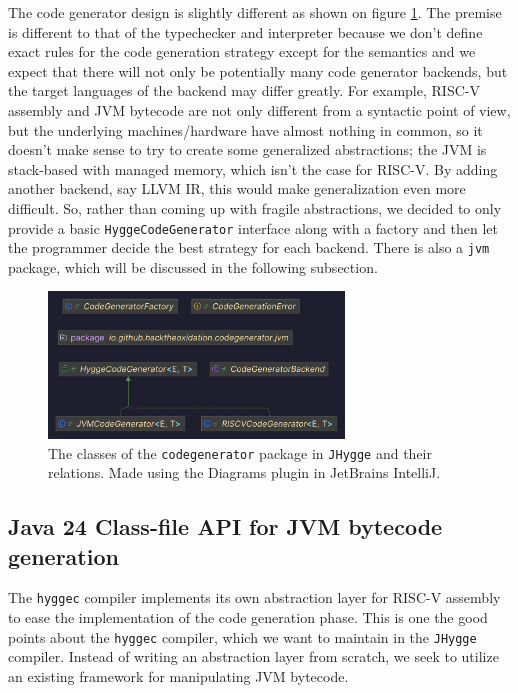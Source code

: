 The code generator design is slightly different as shown on figure \ref{fig:codegenerator_classes}. The premise is different to that of the typechecker and interpreter because we don't define
exact rules for the code generation strategy except for the semantics and we expect that there will not only be potentially many code generator backends,
but the target languages of the backend may differ greatly. For example, RISC-V assembly and JVM bytecode are not only different from a syntactic point
of view, but the underlying machines/hardware have almost nothing in common, so it doesn't make sense to try to create some generalized abstractions;
the JVM is stack-based with managed memory, which isn't the case for RISC-V. By adding another backend, say LLVM IR, this would make generalization
even more difficult. So, rather than coming up with fragile abstractions, we decided to only provide a basic \texttt{HyggeCodeGenerator} interface
along with a factory and then let the programmer decide the best strategy for each backend. There is also a \texttt{jvm} package, which will be
discussed in the following subsection.

\begin{figure}[H]
\centering
\includegraphics[width=0.7\textwidth]{Pictures/Diagrams/codegenerator_classes.png}
\caption{The classes of the \texttt{codegenerator} package in \texttt{JHygge} and their relations. Made using the Diagrams plugin in JetBrains IntelliJ.}
\label{fig:codegenerator_classes}
\end{figure}

\subsection{Java 24 Class-file API for JVM bytecode generation}

The \texttt{hyggec} compiler implements its own abstraction layer for RISC-V assembly to ease the implementation of the code
generation phase. This is one the good points about the \texttt{hyggec} compiler, which we want to maintain in the \texttt{JHygge}
compiler. Instead of writing an abstraction layer from scratch, we seek to utilize an existing framework for manipulating JVM
bytecode.

